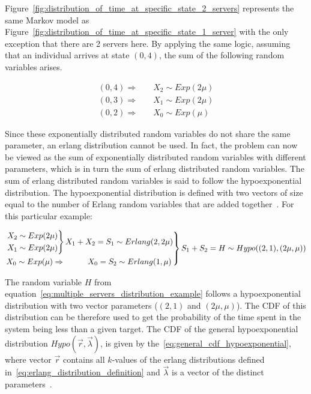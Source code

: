 Figure~\ref{fig:distribution_of_time_at_specific_state_2_servers} represents the
same Markov model as
Figure~\ref{fig:distribution_of_time_at_specific_state_1_server} with the only
exception that there are 2 servers here.
By applying the same logic, assuming that an individual arrives at state
\((0,4)\), the sum of the following random variables arises.

\begin{align}
    (0,4) \Rightarrow \quad & X_2 \sim Exp(2\mu) \nonumber \\
    (0,3) \Rightarrow \quad & X_1 \sim Exp(2\mu) \\
    (0,2) \Rightarrow \quad & X_0 \sim Exp(\mu) \nonumber
\end{align}

Since these exponentially distributed random variables do not share the same
parameter, an erlang distribution cannot be used.
In fact, the problem can now be viewed as the sum of exponentially
distributed random variables with different parameters, which is in turn the
sum of erlang distributed random variables.
The sum of erlang distributed random variables is said to follow the
hypoexponential distribution.
The hypoexponential distribution is defined with two vectors of size equal
to the number of Erlang random variables that are added
together~\cite{Akkouchi2008, Smaili2013}.
For this particular example:

\footnotesize
\begin{align} \label{eq:multiple_servers_distribution_example}
    \begin{rcases}
        \begin{rcases}
            X_2 \sim Exp(2\mu) \\
            X_1 \sim Exp(2\mu)
        \end{rcases}
        X_1 + X_2 = S_1 \sim Erlang(2, 2\mu) \\
        X_0 \sim Exp(\mu) \Rightarrow \hspace{1cm} X_0 = S_2 \sim Erlang(1, \mu)
    \end{rcases}
    S_1 + S_2 = H \sim Hypo((2,1), (2\mu, \mu))
\end{align}
\normalsize

The random variable \(H\) from
equation~\eqref{eq:multiple_servers_distribution_example} follows a
hypoexponential
distribution with two vector parameters (\((2,1)\) and \((2\mu, \mu)\)).
The CDF of this distribution can be therefore used to get the probability of the
time spent in the system being less than a given target.
The CDF of the general hypoexponential distribution \(Hypo(\vec{r},
\vec{\lambda})\), is given by the~\eqref{eq:general_cdf_hypoexponential}, where
vector \(\vec{r}\) contains all \(k\)-values of the erlang distributions
defined in~\eqref{eq:erlang_distribution_definition} and \(\vec{\lambda}\)
is a vector of the distinct parameters~\cite{Favaro2010}.

